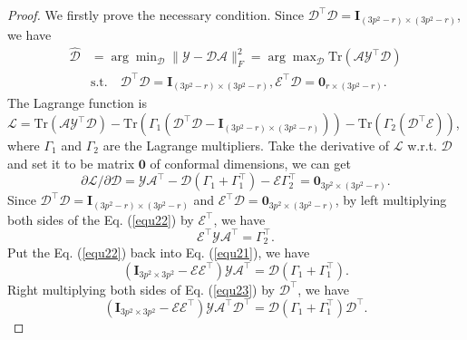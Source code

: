 \begin{proof}
We firstly prove the necessary condition.
Since $\mathcal{D}^{\top}\mathcal{D} = \bm{I}_{(3p^2-r)\times (3p^2-r)}$, we have
\begin{equation}\label{equ20}
\begin{split}
\hat{\mathcal{D}}
&
=
\arg\min\nolimits_{\mathcal{D}}\|\mathcal{Y}-\mathcal{D}\mathcal{A}\|_{F}^{2}
=
\arg\max\nolimits_{\mathcal{D}}\text{Tr}(\mathcal{A}\mathcal{Y}^{\top}\mathcal{D})
\\
&
\text{s.t.}
\quad
\mathcal{D}^{\top}\mathcal{D} = \bm{I}_{(3p^2-r)\times (3p^2-r)}, \mathcal{E}^{\top}\mathcal{D} = \bm{0}_{r\times (3p^2-r)}.
\end{split}
\end{equation}
The Lagrange function is
$
\mathcal{L}
=
\text{Tr}(\mathcal{A}\mathcal{Y}^{\top}\mathcal{D})
-
\text{Tr}(\Gamma_{1}(\mathcal{D}^{\top}\mathcal{D} - \bm{I}_{(3p^2-r)\times (3p^2-r)}))
-
\text{Tr}(\Gamma_{2}(\mathcal{D}^{\top}\mathcal{E}))
$,
where $\Gamma_{1}$ and $\Gamma_{2}$ are the Lagrange multipliers. Take the derivative of $\mathcal{L}$ w.r.t. $\mathcal{D}$ and set it to be matrix $\bm{0}$ of conformal dimensions, we can get
\begin{equation}\label{equ21}
\partial\mathcal{L}/\partial\mathcal{D} 
=
\mathcal{Y}\mathcal{A}^{\top}
-
\mathcal{D}(\Gamma_{1}+\Gamma_{1}^{\top})
-
\mathcal{E}\Gamma_{2}^{\top}
=
\bm{0}_{3p^2\times (3p^2-r)}.
\end{equation}
Since $\mathcal{D}^{\top}\mathcal{D}=\bm{I}_{(3p^2-r)\times (3p^2-r)}$ and $\mathcal{E}^{\top}\mathcal{D} = \bm{0}_{3p^2\times (3p^2-r)}$, by left multiplying both sides of the Eq. (\ref{equ22}) by $\mathcal{E}^{\top}$, we have 
\begin{equation}\label{equ22}
\mathcal{E}^{\top}\mathcal{Y}\mathcal{A}^{\top}
=
\Gamma_{2}^{\top}.
\end{equation}
Put the Eq. (\ref{equ22}) back into Eq. (\ref{equ21}), we have 
\begin{equation}\label{equ23}
(\bm{I}_{3p^2\times 3p^2}-\mathcal{E}\mathcal{E}^{\top})\mathcal{Y}\mathcal{A}^{\top}
=
\mathcal{D}(\Gamma_{1}+\Gamma_{1}^{\top}).
\end{equation}
Right multiplying both sides of Eq. (\ref{equ23}) by $\mathcal{D}^{\top}$, we have
\begin{equation}\label{equ24}
(\bm{I}_{3p^2\times 3p^2}-\mathcal{E}\mathcal{E}^{\top})\mathcal{Y}\mathcal{A}^{\top}\mathcal{D}^{\top}
=
\mathcal{D}(\Gamma_{1}+\Gamma_{1}^{\top})\mathcal{D}^{\top}
.
\end{equation}

\end{proof}
